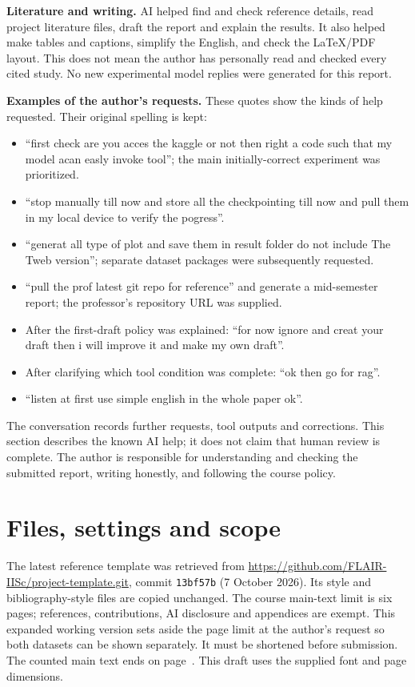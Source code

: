 \documentclass{article}
\begin{document}
\textbf{Literature and writing.} AI helped find and check reference details, read project literature files, draft the report and explain the results. It also helped make tables and captions, simplify the English, and check the LaTeX/PDF layout. This does not mean the author has personally read and checked every cited study. No new experimental model replies were generated for this report.

\textbf{Examples of the author's requests.} These quotes show the kinds of help requested. Their original spelling is kept:
\begin{itemize}
\item ``first check are you acces the kaggle or not then right a code such that my model acan easly invoke tool''; the main initially-correct experiment was prioritized.
\item ``stop manually till now and store all the checkpointing till now and pull them in my local device to verify the pogress''.
\item ``generat all type of plot and save them in result folder do not include The Tweb version''; separate dataset packages were subsequently requested.
\item ``pull the prof latest git repo for reference'' and generate a mid-semester report; the professor's repository URL was supplied.
\item After the first-draft policy was explained: ``for now ignore and creat your draft then i will improve it and make my own draft''.
\item After clarifying which tool condition was complete: ``ok then go for rag''.
\item ``listen at first use simple english in the whole paper ok''.
\end{itemize}
The conversation records further requests, tool outputs and corrections. This section describes the known AI help; it does not claim that human review is complete. The author is responsible for understanding and checking the submitted report, writing honestly, and following the course policy.

\clearpage
\appendix
\section{Files, settings and scope}
The latest reference template was retrieved from
\url{https://github.com/FLAIR-IISc/project-template.git}, commit
\texttt{13bf57b} (7 October 2026). Its style and bibliography-style files are copied unchanged. The course main-text limit is six pages; references, contributions, AI disclosure and appendices are exempt. This expanded working version sets aside the page limit at the author's request so both datasets can be shown separately. It must be shortened before submission. The counted main text ends on page~\pageref{lastmainpage}. This draft uses the supplied font and page dimensions.
\end{document}
